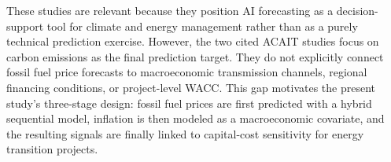 These studies are relevant because they position AI forecasting as a decision-support tool for climate and energy management rather than as a purely technical prediction exercise. However, the two cited ACAIT studies focus on carbon emissions as the final prediction target. They do not explicitly connect fossil fuel price forecasts to macroeconomic transmission channels, regional financing conditions, or project-level WACC. This gap motivates the present study's three-stage design: fossil fuel prices are first predicted with a hybrid sequential model, inflation is then modeled as a macroeconomic covariate, and the resulting signals are finally linked to capital-cost sensitivity for energy transition projects.
